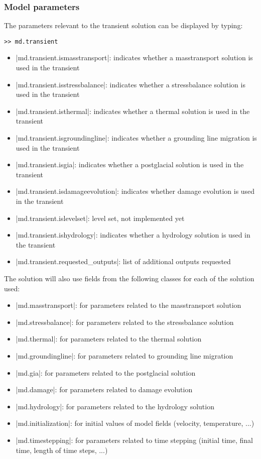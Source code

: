 \subsubsection{Model parameters}
The parameters relevant to the transient solution can be displayed by typing:
\begin{lstlisting}
>> md.transient
\end{lstlisting}

\begin{itemize}
	\item \lstinlinebg|md.transient.ismasstransport|: indicates whether a masstransport solution is used in the transient
	\item \lstinlinebg|md.transient.isstressbalance|: indicates whether a stressbalance solution is used in the transient
	\item \lstinlinebg|md.transient.isthermal|: indicates whether a thermal solution is used in the transient
	\item \lstinlinebg|md.transient.isgroundingline|: indicates whether a grounding line migration is used in the transient
	\item \lstinlinebg|md.transient.isgia|: indicates whether a postglacial solution is used in the transient
	\item \lstinlinebg|md.transient.isdamageevolution|: indicates whether damage evolution is used in the transient
	\item \lstinlinebg|md.transient.islevelset|: level set, not implemented yet
	\item \lstinlinebg|md.transient.ishydrology|: indicates whether a hydrology solution is used in the transient
	\item \lstinlinebg|md.transient.requested_outputs|: list of additional outputs requested
\end{itemize}

The solution will also use fields from the following classes for each of the solution used:
\begin{itemize}
	\item \lstinlinebg|md.masstransport|: for parameters related to the masstransport solution
	\item \lstinlinebg|md.stressbalance|: for parameters related to the stressbalance solution
	\item \lstinlinebg|md.thermal|: for parameters related to the thermal solution
	\item \lstinlinebg|md.groundingline|: for parameters related to grounding line migration
	\item \lstinlinebg|md.gia|: for parameters related to the postglacial solution
	\item \lstinlinebg|md.damage|: for parameters related to damage evolution
	\item \lstinlinebg|md.hydrology|: for parameters related to the hydrology solution
	\item \lstinlinebg|md.initialization|: for initial values of model fields (velocity, temperature, ...)
	\item \lstinlinebg|md.timestepping|: for parameters related to time stepping (initial time, final time, length of time steps, ...)
\end{itemize}


